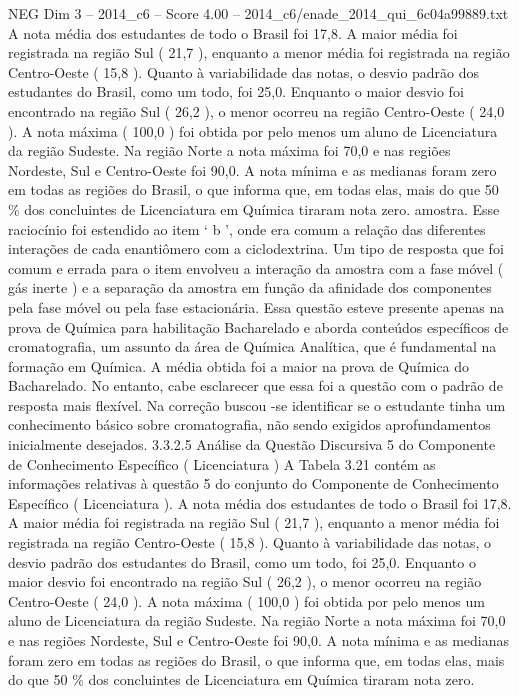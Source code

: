 \begin{textsample}{NEG Dim 3 – 2014\_c6 – Score 4.00 – 2014\_c6/enade\_2014\_qui\_6c04a99889.txt}
A nota média dos estudantes de todo o Brasil foi 17,8.
A maior média foi registrada na região Sul ( 21,7 ), enquanto a menor média foi registrada na região Centro-Oeste ( 15,8 ).
Quanto à variabilidade das notas, o desvio padrão dos estudantes do Brasil, como um todo, foi 25,0.
Enquanto o maior desvio foi encontrado na região Sul ( 26,2 ), o menor ocorreu na região Centro-Oeste ( 24,0 ).
A nota máxima ( 100,0 ) foi obtida por pelo menos um aluno de Licenciatura da região Sudeste.
Na região Norte a nota máxima foi 70,0 e nas regiões Nordeste, Sul e Centro-Oeste foi 90,0.
A nota mínima e as medianas foram zero em todas as regiões do Brasil, o que informa que, em todas elas, mais do que 50 \% dos concluintes de Licenciatura em Química tiraram nota zero. amostra.
Esse raciocínio foi estendido ao item ‘ b ’, onde era comum a relação das diferentes interações de cada enantiômero com a ciclodextrina.
Um tipo de resposta que foi comum e errada para o item envolveu a interação da amostra com a fase móvel ( gás inerte ) e a separação da amostra em função da afinidade dos componentes pela fase móvel ou pela fase estacionária.
Essa questão esteve presente apenas na prova de Química para habilitação Bacharelado e aborda conteúdos específicos de cromatografia, um assunto da área de Química Analítica, que é fundamental na formação em Química.
A média obtida foi a maior na prova de Química do Bacharelado.
No entanto, cabe esclarecer que essa foi a questão com o padrão de resposta mais flexível.
Na correção buscou -se identificar se o estudante tinha um conhecimento básico sobre cromatografia, não sendo exigidos aprofundamentos inicialmente desejados. 3.3.2.5 Análise da Questão Discursiva 5 do Componente de Conhecimento Específico ( Licenciatura ) A Tabela 3.21 contém as informações relativas à questão 5 do conjunto do Componente de Conhecimento Específico ( Licenciatura ).
A nota média dos estudantes de todo o Brasil foi 17,8.
A maior média foi registrada na região Sul ( 21,7 ), enquanto a menor média foi registrada na região Centro-Oeste ( 15,8 ).
Quanto à variabilidade das notas, o desvio padrão dos estudantes do Brasil, como um todo, foi 25,0.
Enquanto o maior desvio foi encontrado na região Sul ( 26,2 ), o menor ocorreu na região Centro-Oeste ( 24,0 ).
A nota máxima ( 100,0 ) foi obtida por pelo menos um aluno de Licenciatura da região Sudeste.
Na região Norte a nota máxima foi 70,0 e nas regiões Nordeste, Sul e Centro-Oeste foi 90,0.
A nota mínima e as medianas foram zero em todas as regiões do Brasil, o que informa que, em todas elas, mais do que 50 \% dos concluintes de Licenciatura em Química tiraram nota zero.

\end{textsample}
